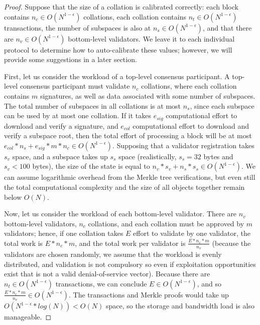 \documentclass[11pt,a4paper]{article}
\theoremstyle{plain}
\theoremstyle{definition}
\theoremstyle{remark}
\begin{document}
\begin{proof}
Suppose that the size of a collation is calibrated correctly: each block contains $n_c \in O(N^{1-\epsilon})$ collations, each collation contains $n_t \in O(N^{1-\epsilon})$ transactions, the number of subspaces is also at $n_s \in O(N^{1-\epsilon})$, and that there are $n_v \in O(N^{1-\epsilon})$ bottom-level validators. We leave it to each individual protocol to determine how to auto-calibrate these values; however, we will provide some suggestions in a later section.

First, let us consider the workload of a top-level consensus participant. A top-level consensus participant must validate $n_c$ collations, where each collation contains $m$ signatures, as well as data associated with some number of subspaces. The total number of subspaces in all collations is at most $n_s$, since each subspace can be used by at most one collation. If it takes $e_{sig}$ computational effort to download and verify a signature, and $e_{col}$ computational effort to download and verify a subspace root, then the total effort of processing a block will be at most $e_{col} * n_s + e_{sig} * m * n_c \in O(N^{1-\epsilon})$. Supposing that a validator registration takes $s_v$ space, and a subspace takes up $s_s$ space (realistically, $s_s = 32$ bytes and $s_v < 100$ bytes), the size of the state is equal to $n_v * s_v + n_s * s_s \in O(N^{1-\epsilon})$. We can assume logarithmic overhead from the Merkle tree verifications, but even still the total computational complexity and the size of all objects together remain below $O(N)$.

Now, let us consider the workload of each bottom-level validator. There are $n_v$ bottom-level validators, $n_c$ collations, and each collation must be approved by $m$ validators; hence, if one collation takes $E$ effort to validate by one validator, the total work is $E * n_c * m$, and the total work per validator is $\frac{E * n_c * m}{n_v}$ (because the validators are chosen randomly, we assume that the workload is evenly distributed, and validation is not compulsory so even if exploitation opportunities exist that is not a valid denial-of-service vector). Because there are $n_t \in O(N^{1-\epsilon})$ transactions, we can conclude $E \in O(N^{1-\epsilon})$, and so $\frac{E * n_c * m}{n_v} \in O(N^{1-\epsilon})$. The transactions and Merkle proofs would take up $O(N^{1-\epsilon} * log(N)) < O(N)$ space, so the storage and bandwidth load is also manageable.
\end{proof}
\end{document}
